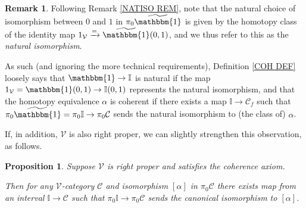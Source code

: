 \documentclass[a4paper,10pt
,draft
]{article}%
\numberwithin{equation}{section}
\numberwithin{figure}{section}
\newtheorem{proposition}[equation]{Proposition}%
\theoremstyle{definition} %
\newtheorem{remark}[equation]{Remark}%
\newcommand{\V}{\ensuremath{\mathcal V}}
\newcommand{\C}{\ensuremath{\mathcal C}}
\newcommand{\1}{\ensuremath{\mathbbm 1}}%
\begin{document}
\begin{remark}
Following Remark \ref{NATISO REM},
note that the natural choice of isomorphism
between $0$ and $1$ in $\pi_0 \widetilde{\mathbbm{1}}$
is given by the homotopy class of the identity map
$1_{\V} \xrightarrow{=} \widetilde{\mathbbm{1}}(0,1)$, 
and we thus refer to this as the \emph{natural isomorphism}.

As such (and ignoring the more technical requirements),
Definition \ref{COH DEF} loosely says that  
$\mathbbm{1} \to \mathbb{I}$
is natural if the map $1_{\V} = \mathbbm{1}(0,1) \to \mathbb{I}(0,1)$
represents the natural isomorphism,
and that the homotopy equivalence $\alpha$ is coherent
if there exists a map $\mathbb{I} \to \mathcal C_f$
such that
$\pi_0 \widetilde{\mathbbm{1}} = 
\pi_0 \mathbb{I} \to \pi_0 \mathcal C$
sends the natural isomorphism to (the class of) $\alpha$.

If, in addition, $\V$ is also right proper, we can slightly strengthen this observation, as follows.
\end{remark}


\begin{proposition}\label{ALTCOH PROP}
Suppose $\V$ is right proper and satisfies the coherence axiom.

Then for any $\V$-category $\mathcal{C}$ and isomorphism  
$[\alpha]$ in $\pi_0 \C$
there exists map from an interval 
$\mathbb{I} \to \mathcal{C}$
such that 
$\pi_0 \mathbb{I} \to \pi_0\mathcal{C}$
sends the canonical isomorphism to $[\alpha]$.
\end{proposition}
\end{document}
